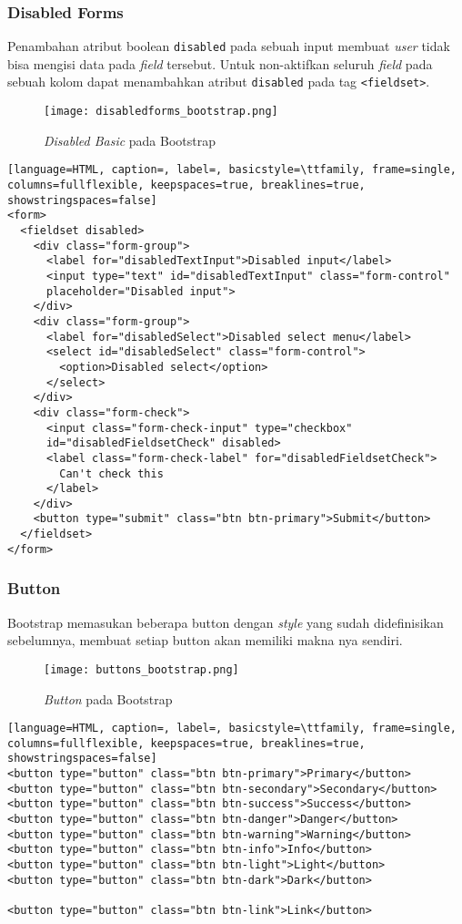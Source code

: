\subsubsection{Disabled Forms}
Penambahan atribut boolean \texttt{disabled} pada sebuah input membuat \textit{user} tidak bisa mengisi data pada \textit{field} tersebut. Untuk non-aktifkan seluruh \textit{field} pada sebuah kolom dapat menambahkan atribut \texttt{disabled} pada tag \texttt{<fieldset>}.
\begin{figure} [H]
	\centering  
	\texttt{[image: disabledforms\_bootstrap.png]}  
	\caption{\textit{Disabled Basic} pada Bootstrap} 
\end{figure}
\begin{lstlisting}[language=HTML, caption=, label=, basicstyle=\ttfamily, frame=single, columns=fullflexible, keepspaces=true, breaklines=true, showstringspaces=false]  
<form>
  <fieldset disabled>
    <div class="form-group">
      <label for="disabledTextInput">Disabled input</label>
      <input type="text" id="disabledTextInput" class="form-control"
      placeholder="Disabled input">
    </div>
    <div class="form-group">
      <label for="disabledSelect">Disabled select menu</label>
      <select id="disabledSelect" class="form-control">
        <option>Disabled select</option>
      </select>
    </div>
    <div class="form-check">
      <input class="form-check-input" type="checkbox" 
      id="disabledFieldsetCheck" disabled>
      <label class="form-check-label" for="disabledFieldsetCheck">
        Can't check this
      </label>
    </div>
    <button type="submit" class="btn btn-primary">Submit</button>
  </fieldset>
</form>
\end{lstlisting}
\subsubsection{Button}
Bootstrap memasukan beberapa button dengan \textit{style} yang sudah didefinisikan sebelumnya, membuat setiap button akan memiliki makna nya sendiri.
\begin{figure} [H]
	\centering  
	\texttt{[image: buttons\_bootstrap.png]}  
	\caption{\textit{Button} pada Bootstrap} 
\end{figure}
\begin{lstlisting}[language=HTML, caption=, label=, basicstyle=\ttfamily, frame=single, columns=fullflexible, keepspaces=true, breaklines=true, showstringspaces=false] 
<button type="button" class="btn btn-primary">Primary</button>
<button type="button" class="btn btn-secondary">Secondary</button>
<button type="button" class="btn btn-success">Success</button>
<button type="button" class="btn btn-danger">Danger</button>
<button type="button" class="btn btn-warning">Warning</button>
<button type="button" class="btn btn-info">Info</button>
<button type="button" class="btn btn-light">Light</button>
<button type="button" class="btn btn-dark">Dark</button>

<button type="button" class="btn btn-link">Link</button>
\end{lstlisting}


